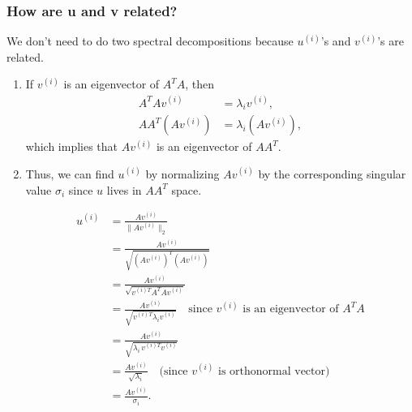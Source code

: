 \subsubsection{How are u and v related?}
\begin{derivation}
    We don’t need to do two spectral decompositions because \( u^{(i)} \)'s and \( v^{(i)} \)'s are related.
    \vspace{1em}

    \begin{enumerate}
        \item If \( v^{(i)} \) is an eigenvector of \( A^T A \), then
        \begin{align*}
            A^T A v^{(i)} &= \lambda_i v^{(i)}, \\
            A A^T (A v^{(i)}) &= \lambda_i (A v^{(i)}),
        \end{align*}
        which implies that \( A v^{(i)} \) is an eigenvector of \( A A^T \).
        \vspace{1em}
    
        \item Thus, we can find $u^{(i)}$ by normalizing \( A v^{(i)} \) by the corresponding singular value \( \sigma_i \) since $u$ lives in $AA^T$ space.
    
        \begin{align*}
            u^{(i)} &= \frac{A v^{(i)}}{\| A v^{(i)} \|_2} \\
            &= \frac{A v^{(i)}}{\sqrt{(A v^{(i)})^T (A v^{(i)})}} \\
            &= \frac{A v^{(i)}}{\sqrt{v^{(i) T} A^T A v^{(i)}}} \\
            &= \frac{A v^{(i)}}{\sqrt{v^{(i) T} \lambda_i v^{(i)}}} \quad \text{since $v^{(i)}$ is an eigenvector of $A^T A$}\\
            &= \frac{A v^{(i)}}{\sqrt{\lambda_i \, v^{(i) T} v^{(i)}}} \\
            &= \frac{A v^{(i)}}{\sqrt{\lambda_i}} \quad \text{(since } v^{(i)} \text{ is orthonormal vector}) \\
            &= \frac{A v^{(i)}}{\sigma_i}.
        \end{align*}
    \end{enumerate}
\end{derivation}

